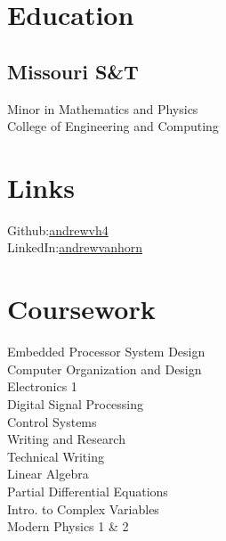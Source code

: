 \documentclass[]{deedy-resume-reversed}
\begin{document}
%
%

%
%



%
%

\begin{minipage}[t]{0.33\textwidth} 


\section{Education} 

\subsection{Missouri S\&T}
Minor in Mathematics and Physics \\
College of Engineering and Computing \\
\sectionsep


\section{Links} 
Github:\href{https://github.com/andrewvh4}{andrewvh4} \\
LinkedIn:\href{https://www.linkedin.com/in/andrewvanhorn/}{andrewvanhorn} \\
\sectionsep


\section{Coursework}
Embedded Processor System Design\\
Computer Organization and Design\\
Electronics 1\\
Digital Signal Processing\\
Control Systems\\
Writing and Research\\
Technical Writing\\
Linear Algebra\\
Partial Differential Equations\\
Intro. to Complex Variables\\
Modern Physics 1 \& 2


\end{minipage}
\end{document}
